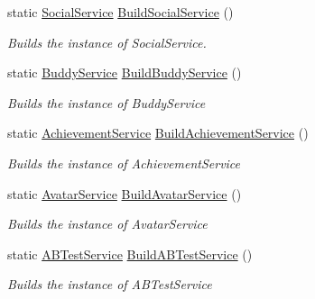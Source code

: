\begin{DoxyCompactItemize}
static \hyperlink{classcom_1_1shephertz_1_1app42_1_1paas_1_1sdk_1_1csharp_1_1social_1_1_social_service}{Social\+Service} \hyperlink{classcom_1_1shephertz_1_1app42_1_1paas_1_1sdk_1_1csharp_1_1_app42_a_p_i_a425c8f23ccccc2a800fff134b8ef07f1}{Build\+Social\+Service} ()
\begin{DoxyCompactList}\small\item\em Builds the instance of Social\+Service. \end{DoxyCompactList}\item 
static \hyperlink{classcom_1_1shephertz_1_1app42_1_1paas_1_1sdk_1_1csharp_1_1buddy_1_1_buddy_service}{Buddy\+Service} \hyperlink{classcom_1_1shephertz_1_1app42_1_1paas_1_1sdk_1_1csharp_1_1_app42_a_p_i_aafafa039d8d8552c4a5192869b6270f3}{Build\+Buddy\+Service} ()
\begin{DoxyCompactList}\small\item\em Builds the instance of Buddy\+Service \end{DoxyCompactList}\item 
static \hyperlink{classcom_1_1shephertz_1_1app42_1_1paas_1_1sdk_1_1csharp_1_1achievement_1_1_achievement_service}{Achievement\+Service} \hyperlink{classcom_1_1shephertz_1_1app42_1_1paas_1_1sdk_1_1csharp_1_1_app42_a_p_i_a3c08719a56f8c228cd42aa267a96885b}{Build\+Achievement\+Service} ()
\begin{DoxyCompactList}\small\item\em Builds the instance of Achievement\+Service \end{DoxyCompactList}\item 
static \hyperlink{classcom_1_1shephertz_1_1app42_1_1paas_1_1sdk_1_1csharp_1_1avatar_1_1_avatar_service}{Avatar\+Service} \hyperlink{classcom_1_1shephertz_1_1app42_1_1paas_1_1sdk_1_1csharp_1_1_app42_a_p_i_a1f3b6cb6a20504422bcb5f47982439ef}{Build\+Avatar\+Service} ()
\begin{DoxyCompactList}\small\item\em Builds the instance of Avatar\+Service \end{DoxyCompactList}\item 
static \hyperlink{classcom_1_1shephertz_1_1app42_1_1paas_1_1sdk_1_1csharp_1_1ab_test_1_1_a_b_test_service}{A\+B\+Test\+Service} \hyperlink{classcom_1_1shephertz_1_1app42_1_1paas_1_1sdk_1_1csharp_1_1_app42_a_p_i_a7631c061c7e5bb0bf0e16f6c4916239e}{Build\+A\+B\+Test\+Service} ()
\begin{DoxyCompactList}\small\item\em Builds the instance of A\+B\+Test\+Service \end{DoxyCompactList}\item 

\end{DoxyCompactItemize}
